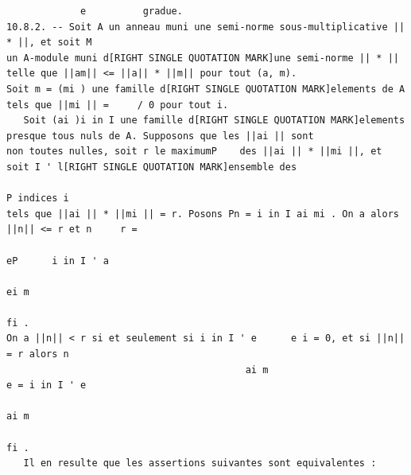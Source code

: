 \documentclass[
  11pt,
]{article}
\begin{document}
\begin{lstlisting}
             e          gradue.
10.8.2. -- Soit A un anneau muni une semi-norme sous-multiplicative || * ||, et soit M
un A-module muni d[RIGHT SINGLE QUOTATION MARK]une semi-norme || * || telle que ||am|| <= ||a|| * ||m|| pour tout (a, m).
Soit m = (mi ) une famille d[RIGHT SINGLE QUOTATION MARK]elements de A tels que ||mi || =     / 0 pour tout i.
   Soit (ai )i in I une famille d[RIGHT SINGLE QUOTATION MARK]elements presque tous nuls de A. Supposons que les ||ai || sont
non toutes nulles, soit r le maximumP    des ||ai || * ||mi ||, et soit I ' l[RIGHT SINGLE QUOTATION MARK]ensemble des
                                                                                    P indices i
tels que ||ai || * ||mi || = r. Posons Pn = i in I ai mi . On a alors ||n|| <= r et n     r =
                                                                               eP      i in I ' a
                                                                                             ei m
                                                                                                fi .
On a ||n|| < r si et seulement si i in I ' e      e i = 0, et si ||n|| = r alors n
                                          ai m                              e = i in I ' e
                                                                                      ai m
                                                                                         fi .
   Il en resulte que les assertions suivantes sont equivalentes :


\end{lstlisting}
\end{document}
